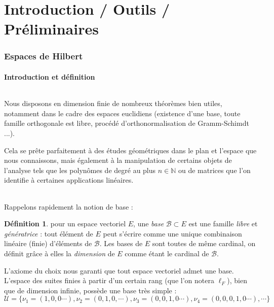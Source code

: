 \documentclass[]{article}
\theoremstyle{remark}
\theoremstyle{definition}
\newtheorem{mydef}{Définition}
\begin{document}
	\part{Introduction / Outils / Préliminaires}
	\section{Espaces de Hilbert}
	\subsection{Introduction et définition}

	\paragraph*{}
	
	Nous disposons en dimension finie de nombreux théorèmes bien utiles, notamment dans le cadre des espaces euclidiens (existence d'une base, toute famille orthogonale est libre, procédé d'orthonormalisation de Gramm-Schimdt ...).
	
	Cela se prête parfaitement à des études géométriques dans le plan et l'espace que nous connaissons, mais également à la manipulation de certains objets de l'analyse tels que les polynômes de degré au plus $n \in \mathbb{N}$ ou de matrices que l'on identifie à certaines applications linéaires.
	
	\paragraph*{}
	
	Rappelons rapidement la notion de base :
	
	\begin{mydef}
		pour un espace vectoriel $E$, une \textit{base} $\mathcal{B} \subset E$ est une famille \textit{libre} et \textit{génératrice} : tout élément de $E$ peut s'écrire comme une unique combinaison linéaire (finie) d'éléments de $\mathcal{B}$. Les bases de $E$ sont toutes de même cardinal, on définit grâce à elles la \textit{dimension} de $E$ comme étant le cardinal de $\mathcal{B}$.
	\end{mydef}
	
	L'axiome du choix nous garanti que tout espace vectoriel admet une base. L'espace des suites finies à partir d'un certain rang (que l'on notera $\ell_F$), bien que de dimension infinie, possède une base très simple : $$\mathcal{U} = \{\nu_1 = (1, 0, 0 \cdots), \nu_2 = (0, 1, 0, \cdots), \nu_3 = (0, 0, 1, 0 \cdots), \nu_4 = (0, 0, 0, 1, 0 \cdots), \cdots\}$$
	
\end{document}
